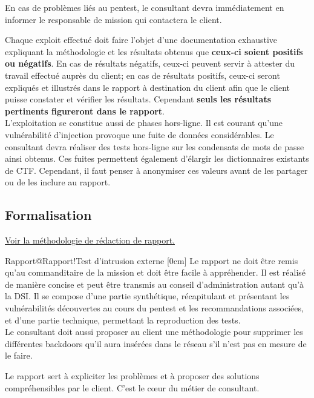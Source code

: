 \documentclass[twoside,a4paper,12pt,titlepage]{book}
\newcommand{\MarginPar}[2]{\marginnote{\scriptsize #1}[#2]}
\begin{document}
\begin{Stop}En cas de problèmes liés au pentest, le consultant devra immédiatement en informer le responsable de mission qui contactera le client.\end{Stop}
	Chaque exploit effectué doit faire l'objet d'une documentation exhaustive expliquant la méthodologie et les résultats obtenus que \textbf{ceux-ci soient positifs ou négatifs}. En cas de résultats négatifs, ceux-ci peuvent servir à attester du travail effectué auprès du client; en cas de résultats positifs, ceux-ci seront expliqués et illustrés dans le rapport à destination du client afin que le client puisse constater et vérifier les résultats. Cependant \textbf{seuls les résultats pertinents figureront dans le rapport}.\\
	L'exploitation se constitue aussi de phases hors-ligne. Il est courant qu'une vulnérabilité d'injection provoque une fuite de données considérables. Le consultant devra réaliser des tests hors-ligne sur les condensats de mots de passe ainsi obtenus. Ces fuites permettent également d'élargir les dictionnaires existants de CTF. Cependant, il faut penser à anonymiser ces valeurs avant de les partager ou de les inclure au rapport.\\

\subsection{Formalisation}
\ForwardToIndex  \hspace{1em}  \hyperref[Rapport]{Voir la méthodologie de rédaction de rapport.}
\begin{Define}{Rapport@Rapport!Test d'intrusion externe}
	\MarginPar{\textbf{Rapport}}{0cm}
	Le rapport ne doit être remis qu'au commanditaire de la mission et doit être facile à appréhender. Il est réalisé de manière concise et peut être transmis au conseil d'administration autant qu'à la DSI. Il se compose d'une partie synthétique, récapitulant et présentant les vulnérabilités découvertes au cours du pentest et les recommandations associées, et d'une partie technique, permettant la reproduction des tests.\\
Le consultant doit aussi proposer au client une méthodologie pour supprimer les différentes backdoors qu'il aura insérées dans le réseau s'il n'est pas en mesure de le faire.
\end{Define}
Le rapport sert à expliciter les problèmes et à proposer des solutions compréhensibles par le client. C'est le cœur du métier de consultant.
\end{document}
